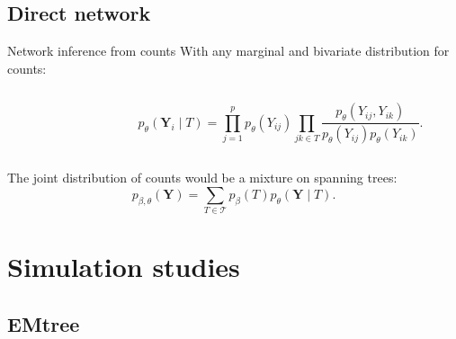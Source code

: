 \documentclass[11pt]{beamer}
\newcommand{\Ybf}{{\boldsymbol{Y}}}
\newcommand{\length}{1.5}
\newcommand{\emphase}[1]{\textcolor{Complement}{#1}}
\begin{document}
 \subsection{Direct network}
 \begin{frame}{Network inference from counts}
  With \emphase{any marginal and bivariate distribution for counts}:\\
\begin{columns}
 \begin{column}{0.1\linewidth}
  \begin{flushright}
   \end{flushright}
   \end{column}
    \begin{column}{0.9\linewidth}
 $$p_\theta(\Ybf_i \mid T) = \prod_{j=1}^p p_\theta(Y_{ij}) \prod_{jk\in T} \frac{p_\theta(Y_{ij},Y_{ik})}{p_\theta(Y_{ij})p_\theta(Y_{ik})}.$$
  \end{column}
  \end{columns}
  \vspace{0.5cm}
  
The joint distribution of counts would be a mixture on spanning trees:
$$p_{\beta, \theta}(\Ybf ) = \sum_{T\in \mathcal{T}} p_\beta(T)p_\theta(\Ybf\mid T).$$

 \end{frame}
 \section{Simulation studies}
 \subsection{EMtree}

\end{document}
